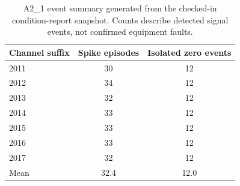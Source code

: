 \begin{table}[t]
  \centering
  \caption{A2\_1 event summary generated from the checked-in condition-report snapshot. Counts describe detected signal events, not confirmed equipment faults.}
  \label{tab:a2-events}
  \small
  \begin{tabular}{lcc}
    \toprule
    Channel suffix & Spike episodes & Isolated zero events \\
    \midrule
    2011 & 30 & 12 \\
    2012 & 34 & 12 \\
    2013 & 32 & 12 \\
    2014 & 33 & 12 \\
    2015 & 33 & 12 \\
    2016 & 33 & 12 \\
    2017 & 32 & 12 \\
    \midrule
    Mean & 32.4 & 12.0 \\
    \bottomrule
  \end{tabular}
\end{table}
